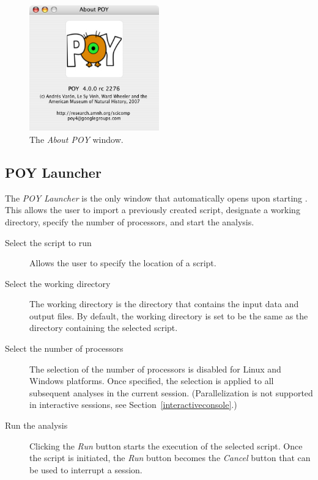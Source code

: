 \begin{figure}[htpb]
    \begin{center}
        \includegraphics[width=0.5\textwidth]{figures/about_window.jpg}
    \end{center}
    \caption{The \emph{About POY} window.}
    \label{fig:about_window}
\end{figure}

\subsection{POY Launcher} 
The \emph{POY Launcher} is the only window that automatically opens upon starting
\poy. This allows the user to import a previously created script,
designate a working directory, specify the number of processors,
and start the analysis.

\begin{description}
	\item[Select the script to run]
     Allows the user to specify the location of a \poy script.
	\item[Select the working directory]
    The working directory is the
    directory that contains the input data and output files. By default, the working directory is set to be the same as the
    directory containing the selected \poy script. 
	\item[Select the number of processors]
    The selection of the number of processors is disabled for Linux
    and Windows platforms. Once specified, the selection is applied
    to all subsequent analyses in the current \poy session. (Parallelization is not supported in interactive sessions, see Section~\ref{interactiveconsole}.)
	\item[Run the analysis]
    Clicking the \emph{Run} button starts the execution of the selected
    script. Once the script is initiated, the \emph{Run} button
    becomes the \emph{Cancel} button that can be used to interrupt
    a \poy session.
\end{description}

